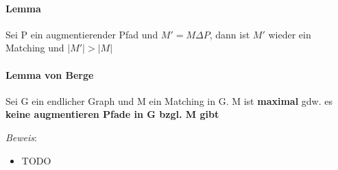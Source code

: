 \documentclass[12pt,a4paper]{article}
\begin{document}
\paragraph{Lemma}
\flushleft
Sei P ein augmentierender Pfad und $M' = M \Delta P$, dann ist $M'$ wieder ein Matching und $\vert M' \vert > \vert M \vert$
\begin{figure}[H]
\centering
{}
\end{figure}
\paragraph{Lemma von Berge}
\flushleft
Sei G ein endlicher Graph und M ein Matching in G. M ist \textbf{maximal} gdw. es \textbf{keine augmentieren Pfade in G bzgl. M gibt}

\textit{Beweis}:
\begin{itemize}
\item TODO
\end{itemize}
\end{document}
